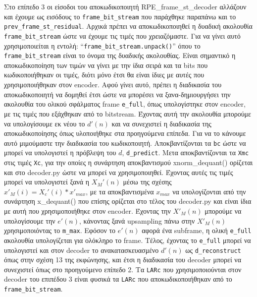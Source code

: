 \documentclass{article}
\begin{document}
Στο επίπεδο 3 οι είσοδοι του αποκωδικοποιητή RPE\_frame\_st\_decoder αλλάζουν
και έχουμε ως εισόδους το \verb|frame_bit_stream| που παράχθηκε παραπάνω και
το \verb|prev_frame_st_residual|. Αρχικά πρέπει να αποκωδικοποιηθεί
η δυαδική ακολουθία \verb|frame_bit_stream| ώστε να έχουμε τις τιμές που
χρειαζόμαστε. Για να γίνει αυτό χρησιμοποιείται η εντολή:
``\verb|frame_bit_stream.unpack()|'' όπου το \verb|frame_bit_stream| είναι το όνομα της δυαδικής
ακολουθίας. Είναι σημαντικό η αποκωδικοποίηση των τιμών να
γίνει με την ίδια σειρά και τα bits που κωδικοποιήθηκαν οι τιμές,
διότι μόνο έτσι θα είναι ίδιες με αυτές που χρησιμοποιήθηκαν στον
encoder. Αφού γίνει αυτό, πρέπει η διαδικασία του αποκωδικοποιητή
να δομηθεί έτσι ώστε να μπορέσει να ξανα-δημιουργήσει την
ακολουθία του ολικού σφάλματος frame \verb|e_full|, όπως υπολογίστηκε
στον encoder, με τις τιμές που εξάχθηκαν από το bitstream. Έχοντας αυτή
την ακολουθία μπορούμε να υπολογίσουμε εκ νέου το $d'(n)$ και να
συνεχιστεί η διαδικασία της αποκωδικοποίησης όπως υλοποιήθηκε
στα προηγούμενα επίπεδα. Για να το κάνουμε αυτό μιμούμαστε την
διαδικασία του κωδικοποιητή. Αποκβαντίζονται τα \verb|bc| ώστε να μπορεί
να υπολογιστεί η πρόβλεψη του $d$, \verb|d_predict|.  Μετα αποκβαντίζονται τα \verb|Xmc|
στις τιμές \verb|Xc|, για την οποίες η συνάρτηση αποκβαντισμού xnorm\_dequant()
ορίζεται και στο decoder.py ώστε να μπορεί να χρησιμοποιηθεί. Έχοντας
αυτές τις τιμές μπορεί να υπολογιστεί ξανά η $X_M'(n)$ μέσω της σχέσης
$x'_M(i) = X_c'(i)*x'_{max}$, με τα αποκβαντισμένα $x_{max}$ να υπολογίζονται από
την συνάρτηση x\_dequant() που επίσης ορίζεται στο τέλος του decoder.py και
είναι ίδια με αυτή που χρησιμοποιήθηκε στον encoder. Έχοντας την $X'_M(n)$
μπορούμε να υπολογίσουμε την $e'(n)$, κάνοντας ξανά upsampling πάνω στην
$X'_M(n)$ χρησιμοποιόντας το \verb|m_max|. Εφόσον το $e'(n)$ αφορά ένα subframe, η ολική
\verb|e_full| ακολουθία υπολογίζεται για ολόκληρο το frame. Τέλος, έχοντας το
\verb|e_full| μπορεί να υπολογιστεί και στον decoder το ανακατασκευασμένο $d'(n)$
ως \verb|d_reconstruct| όπως στην σχέση 13 της εκφώνησης, και έτσι η διαδικασία
του decoder μπορεί να συνεχιστεί όπως στο προηγούμενο επίπεδο 2. Τα
\verb|LARc| που χρησιμοποιούνται στον decoder του επιπέδου 3 είναι φυσικά
τα \verb|LARc| που αποκωδικοποιήθηκαν από το \verb|frame_bit_stream|.
\end{document}
